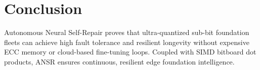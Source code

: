 \documentclass[10pt,twocolumn,letterpaper]{article}
\begin{document}
\section{Conclusion}
Autonomous Neural Self-Repair proves that ultra-quantized sub-bit foundation fleets can achieve high fault tolerance and resilient longevity without expensive ECC memory or cloud-based fine-tuning loops. Coupled with SIMD bitboard dot products, ANSR ensures continuous, resilient edge foundation intelligence.
\end{document}

